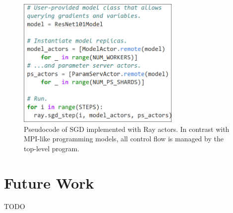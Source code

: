 \documentclass{article}
\begin{document}
\begin{figure}
    \centering
    \includegraphics[width=3.1in,keepaspectratio]{fig/pseudocode.png}
    \caption{
    \small{
        Pseudocode of SGD implemented with Ray actors. In contrast with MPI-like
        programming models, all control flow is managed by the top-level program.
    }
    }
    \label{fig:code}
\end{figure}






\section{Future Work}
{\color{red} TODO}


{
\footnotesize


}
\end{document}
